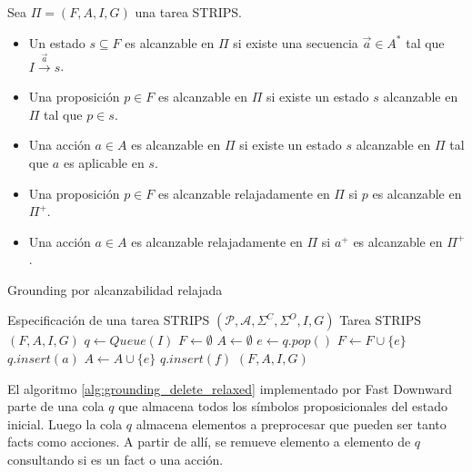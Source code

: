 \begin{mydef}
    Sea $\Pi = (F, A, I, G)$ una tarea STRIPS.    
    \begin{itemize}
        \item Un estado $s \subseteq F$ es alcanzable en $\Pi$ si existe una
        secuencia $\vec{a} \in A^{*}$ tal que $I \xrightarrow{\vec{a}} s$.
    
        \item Una proposición $p \in F$ es alcanzable en $\Pi$ si existe un
        estado $s$ alcanzable en $\Pi$ tal que $p \in s$.

        \item Una acción $a \in A$ es alcanzable en $\Pi$ si existe un estado
        $s$ alcanzable en $\Pi$ tal que $a$ es aplicable en $s$.

        \item Una proposición $p \in F$ es alcanzable relajadamente en $\Pi$ si
        $p$ es alcanzable en $\Pi^{+}$.

        \item Una acción $a \in A$ es alcanzable relajadamente en $\Pi$ si
        $a^{+}$ es alcanzable en $\Pi^{+}$.
    \end{itemize}
\end{mydef}


\begin{algorithm}
    \caption{Grounding por alcanzabilidad
    relajada}\label{alg:grounding_delete_relaxed}
    \begin{algorithmic}[1]
    \Require Especificación de una tarea STRIPS $(\mathcal{P}, \mathcal{A},
    \Sigma^{C}, \Sigma^{O}, I, G)$ \Ensure Tarea STRIPS $(F, A, I, G)$ \State $q
    \gets Queue(I)$ \State $F \gets \emptyset$ \State $A \gets \emptyset$
     \State $e \gets q.pop()$  \State
    $F \gets F \cup \{e\}$  \State
    $q.insert(a)$ \EndFor \Else \State $A \gets A \cup \{e\}$  \State $q.insert(f)$ \EndFor \EndIf \EndWhile \State
    \Return $(F, A, I, G)$
    \end{algorithmic}
\end{algorithm}

El algoritmo \ref{alg:grounding_delete_relaxed} implementado por Fast Downward
parte de una cola $q$ que almacena todos los símbolos proposicionales del estado
inicial. Luego la cola $q$ almacena elementos a preprocesar que pueden ser tanto
facts como acciones. A partir de allí, se remueve elemento a elemento de $q$
consultando si es un fact o una acción.

